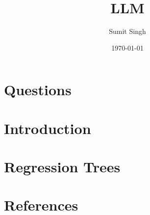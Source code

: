\documentclass{article}
\title{LLM}
\author{Sumit Singh}
\date{\today}
\begin{document}
\maketitle

\section{Questions}

\section{Introduction}

\section{Regression Trees}

\section{References}
\end{document}
